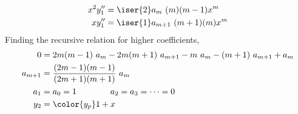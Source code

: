 \begin{enumerate}
\begin{align}
              x^2 y_1'' & = \iser{2}a_{m}\ (m)(m - 1)x^{m}     \\
              x y_1''   & = \iser{1}a_{m+1}\ (m+1)(m)x^{m}
          \end{align}
          Finding the recursive relation for higher coefficients,
          \begin{align}
              0       & = 2m(m-1)\ a_m - 2m(m+1)\ a_{m+1} - m\ a_m
              - (m+1)\ a_{m+1} + a_m                                 \\
              a_{m+1} & = \frac{(2m - 1)(m - 1)}{(2m+1)(m+1)}\ a_m   \\
              a_{1}   & = a_0 = 1 \qquad\qquad a_2 = a_3 = \dots = 0 \\
              y_2     & = \color{y_p} 1 + x
          \end{align}


\end{enumerate}
